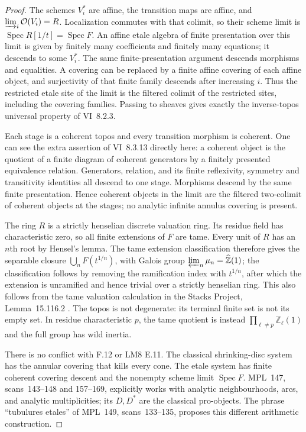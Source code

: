 \begin{proof}
The schemes $V_i^*$ are affine, the transition maps are affine, and
$\varinjlim_i\mathcal O(V_i)=R$. Localization commutes with that colimit,
so their scheme limit is $\operatorname{Spec}R[1/t]=\operatorname{Spec}F$.
An affine etale algebra of finite presentation over this limit is given
by finitely many coefficients and finitely many equations; it descends
to some $V_i^*$. The same finite-presentation argument descends morphisms
and equalities. A covering can be replaced by a finite affine covering
of each affine object, and surjectivity of that finite family descends
after increasing $i$. Thus the restricted etale site of the limit is
the filtered colimit of the restricted sites, including the covering
families. Passing to sheaves gives exactly the inverse-topos universal
property of VI~8.2.3.

Each stage is a coherent topos and every transition morphism is coherent.
One can see the extra assertion of VI~8.3.13 directly here: a coherent
object is the quotient of a finite diagram of coherent generators by a
finitely presented equivalence relation. Generators, relation, and its
finite reflexivity, symmetry and transitivity identities all descend to
one stage. Morphisms descend by the same finite presentation. Hence
coherent objects in the limit are the filtered two-colimit of coherent
objects at the stages; no analytic infinite annulus covering is present.

The ring $R$ is a strictly henselian discrete valuation ring. Its residue
field has characteristic zero, so all finite extensions of $F$ are tame.
Every unit of $R$ has an $n$th root by Hensel's lemma. The tame extension
classification therefore gives the separable closure
$\bigcup_n F(t^{1/n})$, with Galois group
$\varprojlim_n\mu_n=\widehat{\mathbb Z}(1)$; the classification follows
by removing the ramification index with $t^{1/n}$, after which the
extension is unramified and hence trivial over a strictly henselian
ring. This also follows from the tame valuation calculation in the
Stacks Project, Lemma~15.116.2 \citep{StacksTameDVR}.
The topos is not degenerate: its terminal finite set is not its empty
set. In residue characteristic $p$, the tame quotient is instead
$\prod_{\ell\ne p}\mathbb Z_\ell(1)$ and the full group has wild inertia.

There is no conflict with F.12 or LM8 E.11. The classical shrinking-disc
system has the annular covering that kills every cone. The etale system
has finite coherent covering descent and the nonempty scheme limit
$\operatorname{Spec}F$. MPL~147, scans~143--148 and 157--169, explicitly
works with analytic neighbourhoods, arcs, and analytic multiplicities;
its $D,D^*$ are the classical pro-objects. The phrase ``tubulures etales''
of MPL~149, scans~133--135, proposes this different arithmetic construction.
\end{proof}

